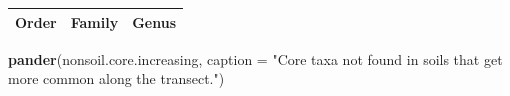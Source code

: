 \documentclass[]{article}
\newenvironment{Shaded}{\begin{snugshade}}{\end{snugshade}}
\newcommand{\KeywordTok}[1]{\textcolor[rgb]{0.13,0.29,0.53}{\textbf{#1}}}
\newcommand{\DataTypeTok}[1]{\textcolor[rgb]{0.13,0.29,0.53}{#1}}
\newcommand{\StringTok}[1]{\textcolor[rgb]{0.31,0.60,0.02}{#1}}
\newcommand{\NormalTok}[1]{#1}
\begin{document}
\begin{longtable}[]{@{}ccc@{}}
\toprule
\begin{minipage}[t]{0.15\columnwidth}\centering\strut
\textbf{Order}\strut
\end{minipage} & \begin{minipage}[t]{0.16\columnwidth}\centering\strut
\textbf{Family}\strut
\end{minipage} & \begin{minipage}[t]{0.16\columnwidth}\centering\strut
\textbf{Genus}\strut
\end{minipage}\tabularnewline
\bottomrule
\end{longtable}

\begin{Shaded}
\begin{Highlighting}[]
\KeywordTok{pander}\NormalTok{(nonsoil.core.increasing, }\DataTypeTok{caption =} \StringTok{"Core taxa not found in soils that get more common along the transect."}\NormalTok{)}
\end{Highlighting}
\end{Shaded}
\end{document}
